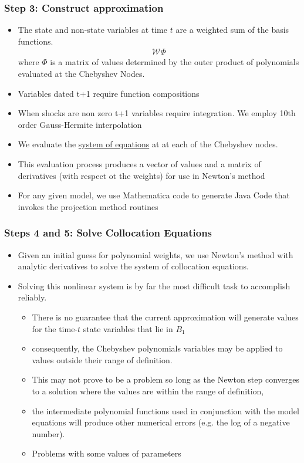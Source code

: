 \documentclass[tikz]{beamer}
\begin{document}
\begin{frame}

\frametitle{Step 3: Construct approximation}
{\small

\begin{itemize}
\item The state and non-state variables at time $t$ are a weighted sum
  of the basis functions.
  \begin{gather*}
    \mathcal{W} \Phi
  \end{gather*}
  where $\Phi$ is a matrix of values determined by the outer product
  of polynomials evaluated at the Chebyshev Nodes.
\item Variables dated t+1 require function compositions
\item When shocks are non zero t+1 variables require integration.  We
  employ 10th order Gauss-Hermite interpolation
\item We evaluate the \hyperref[eqns]{system of equations} at at each
  of the Chebyshev nodes.
\item This evaluation process produces a vector of values and a matrix
  of derivatives (with respect ot the weights) for use in Newton's
  method
\item For any given model, we use Mathematica code to generate Java
  Code that invokes the projection method routines
\end{itemize}

}

\end{frame}
\begin{frame}

\frametitle{Steps 4 and 5: Solve Collocation Equations}
\begin{itemize}
\item Given an initial guess for polynomial weights, we use Newton's
  method with analytic derivatives to solve the system of collocation
  equations.
\item Solving this nonlinear system is by far the most difficult task
  to accomplish reliably.
  \begin{itemize}
  \item There is no guarantee that the current approximation will
    generate values for the time-$t$ state variables that lie in
    $B_{1}$
  \item consequently, the Chebyshev polynomials variables may be
    applied to values outside their range of definition.
  \item This may not prove to be a problem so long as the Newton step
    converges to a solution where the values are within the range of
    definition,
  \item the intermediate polynomial functions used %
    {in conjunction} with the model equations will produce other
    numerical errors (e.g. the log of a negative number).
  \item {Problems with some values of parameters}
  \end{itemize}
\end{itemize}



\end{frame}
\end{document}
